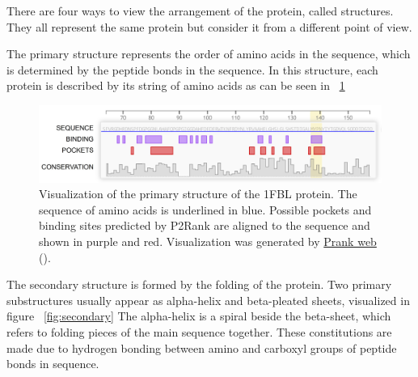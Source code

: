 There are four ways to view the arrangement of the protein, called structures. They all represent the same protein but consider it from a different point of view.

The primary structure represents the order of amino acids in the sequence, which is determined by the peptide bonds in the sequence. In this structure, each protein is described by its string of amino acids as can be seen in ~\ref{fig:primary}

\begin{figure}
    \centering
    \includegraphics[width=1\linewidth]{primary_done.jpg}
    \caption{Visualization of the primary structure of the 1FBL protein. The sequence of amino acids is underlined in blue. Possible pockets and binding sites predicted by P2Rank are aligned to the sequence and shown in purple and red. Visualization was generated by \href{https://prankweb.cz/viewer?id=1fbl&database=v3-conservation-hmm}{Prank web} (\cite{prankweb}).}
    \label{fig:primary}
\end{figure}

The secondary structure is formed by the folding of the protein. Two primary substructures usually appear as alpha-helix and beta-pleated sheets, visualized in figure ~\ref{fig:secondary} The alpha-helix is a spiral beside the beta-sheet, which refers to folding pieces of the main sequence together. These constitutions are made due to hydrogen bonding between amino and carboxyl groups of peptide bonds in sequence. 


